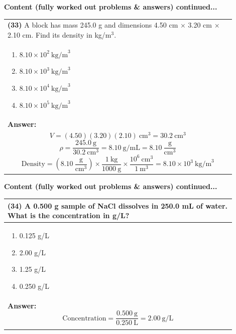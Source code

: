 \documentclass{article}
\begin{document}
\newpage
\noindent
{\large\textbf{Content (fully worked out problems \& answers) continued...}}\\[0.2em]
\vspace{0.2cm}
\begin{tabular}{|p{0.9\linewidth}|}
\hline
\vspace{0.2cm}
\textbf{(33)} A block has mass 245.0 g and dimensions 4.50 cm $\times$ 3.20 cm $\times$ 2.10 cm. Find its density in kg/m$^3$.\\
\begin{minipage}[t]{0.85\linewidth}
\begin{enumerate}[label=\alph*.]
   \item $8.10\times10^{2}~\text{kg/m}^3$ \
   \item $8.10\times10^{3}~\text{kg/m}^3$ \
   \item $8.10\times10^{4}~\text{kg/m}^3$ \
   \item $8.10\times10^{5}~\text{kg/m}^3$
\end{enumerate}
\end{minipage}\\
\hline
\vspace{0.2cm}
\textbf{Answer:}\\
\[
V=(4.50)(3.20)(2.10)~\text{cm}^3=30.2~\text{cm}^3
\]
\[
\rho=\frac{245.0~\text{g}}{30.2~\text{cm}^3}=8.10~\text{g/mL}=8.10~\frac{\text{g}}{\text{cm}^3}
\]
\[
\text{Density}=\left(8.10~\frac{\text{g}}{\text{cm}^3}\right)\times\frac{1~\text{kg}}{1000~\text{g}}\times\frac{10^6~\text{cm}^3}{1~\text{m}^3}=8.10\times10^{3}~\text{kg/m}^3
\] \\
\hline
\end{tabular}

\newpage
\noindent
{\large\textbf{Content (fully worked out problems \& answers) continued...}}\\
\vspace{0.2cm}
\begin{tabular}{|p{0.9\linewidth}|}
\hline
\vspace{0.2cm}
\textbf{(34)} A 0.500 g sample of NaCl dissolves in 250.0 mL of water. What is the concentration in g/L?\\
\hline
\vspace{0.2cm}
\begin{minipage}[t]{0.85\linewidth}
\begin{enumerate}[label=\alph*.]
\item 0.125 g/L \
\item 2.00 g/L  \
\item 1.25 g/L \
\item 0.250 g/L
\end{enumerate}
\end{minipage} \\
\hline
\vspace{0.2cm}
\textbf{Answer:} 
\[
\text{Concentration} = \frac{0.500~\text{g}}{0.250~\text{L}} = 2.00~\text{g/L}
\] \\
\\
\hline
\end{tabular}
\end{document}
